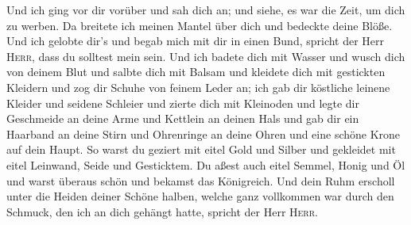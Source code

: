  Und ich ging vor dir vorüber und sah dich an; und siehe,
es war die Zeit, um dich zu werben. Da breitete ich meinen Mantel über
dich und bedeckte deine Blöße. Und ich gelobte dir's und begab mich mit
dir in einen Bund, spricht der Herr \textsc{Herr}, dass du solltest mein
sein.  Und ich badete dich mit Wasser und wusch dich von
deinem Blut und salbte dich mit Balsam  und kleidete dich
mit gestickten Kleidern und zog dir Schuhe von feinem Leder an; ich gab
dir köstliche leinene Kleider und seidene Schleier  und
zierte dich mit Kleinoden und legte dir Geschmeide an deine Arme und
Kettlein an deinen Hals  und gab dir ein Haarband an
deine Stirn und Ohrenringe an deine Ohren und eine schöne Krone auf dein
Haupt.  So warst du geziert mit eitel Gold und Silber und
gekleidet mit eitel Leinwand, Seide und Gesticktem. Du aßest auch eitel
Semmel, Honig und Öl und warst überaus schön und bekamst das Königreich.
 Und dein Ruhm erscholl unter die Heiden deiner Schöne
halben, welche ganz vollkommen war durch den Schmuck, den ich an dich
gehängt hatte, spricht der Herr \textsc{Herr}.

